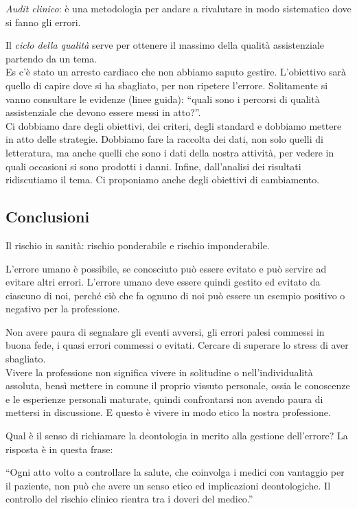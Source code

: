\begin{itemize}
  \emph{Audit
  clinico}: è una metodologia per andare a rivalutare in modo
  sistematico dove si fanno gli errori.
\end{itemize}

Il \emph{ciclo della qualità} serve per ottenere il massimo della
qualità assistenziale partendo da un tema.\\
Es c'è stato un arresto cardiaco che non abbiamo saputo gestire.
L'obiettivo sarà quello di capire dove si ha sbagliato, per non ripetere
l'errore. Solitamente si vanno consultare le evidenze (linee guida):
``quali sono i percorsi di qualità assistenziale che devono essere messi
in atto?''.\\
Ci dobbiamo dare degli obiettivi, dei criteri, degli standard e dobbiamo
mettere in atto delle strategie. Dobbiamo fare la raccolta dei dati, non
solo quelli di letteratura, ma anche quelli che sono i dati della nostra
attività, per vedere in quali occasioni si sono prodotti i danni.
Infine, dall'analisi dei risultati ridiscutiamo il tema. Ci proponiamo
anche degli obiettivi di cambiamento.

\subsection{Conclusioni}

Il rischio in sanità: rischio ponderabile e rischio imponderabile.

L'errore umano è possibile, se conosciuto può essere evitato e può
servire ad evitare altri errori. L'errore umano deve essere quindi
gestito ed evitato da ciascuno di noi, perché ciò che fa ognuno di noi
può essere un esempio positivo o negativo per la professione.

Non avere paura di segnalare gli eventi avversi, gli errori palesi
commessi in buona fede, i quasi errori commessi o evitati. Cercare di
superare lo stress di aver sbagliato.\\
Vivere la professione non significa vivere in solitudine o
nell'individualità assoluta, bensì mettere in comune il proprio vissuto
personale, ossia le conoscenze e le esperienze personali maturate,
quindi confrontarsi non avendo paura di mettersi in discussione. E
questo è vivere in modo etico la nostra professione.

Qual è il senso di richiamare la deontologia in merito alla gestione
dell'errore? La risposta è in questa frase:

``Ogni atto volto a controllare la salute, che coinvolga i medici con
vantaggio per il paziente, non può che avere un senso etico ed
implicazioni deontologiche. Il controllo del rischio clinico rientra tra
i doveri del medico.''
